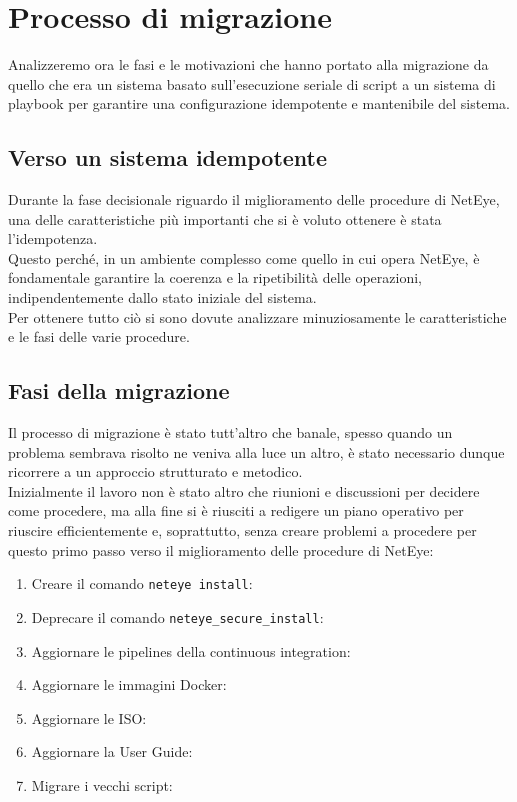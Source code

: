 \section{Processo di migrazione}
\label{sec:processo_migrazione}

Analizzeremo ora le fasi e le motivazioni che hanno portato alla migrazione da
quello che era un sistema basato sull'esecuzione seriale di script a un sistema
di playbook per garantire una configurazione idempotente e mantenibile del
sistema.

\subsection{Verso un sistema idempotente}
\label{sub:prerequisiti_migrazione}

Durante la fase decisionale riguardo il miglioramento delle procedure di NetEye,
una delle caratteristiche più importanti che si è voluto ottenere è stata l'idempotenza.\\
Questo perché, in un ambiente complesso come quello in cui opera NetEye, è
fondamentale garantire la coerenza e la ripetibilità delle operazioni, indipendentemente
dallo stato iniziale del sistema.\\ Per ottenere tutto ciò si sono dovute analizzare
minuziosamente le caratteristiche e le fasi delle varie procedure.

\subsection{Fasi della migrazione}
\label{sub:fasi_migrazione}

Il processo di migrazione è stato tutt'altro che banale, spesso quando un problema
sembrava risolto ne veniva alla luce un altro, è stato necessario dunque
ricorrere a un approccio strutturato e metodico.\\ Inizialmente il lavoro non è
stato altro che riunioni e discussioni per decidere come procedere, ma alla fine
si è riusciti a redigere un piano operativo per riuscire efficientemente e,
soprattutto, senza creare problemi a procedere per questo primo passo verso il miglioramento
delle procedure di NetEye:
\begin{enumerate}
  \item Creare il comando \texttt{neteye install}:

  \item Deprecare il comando \texttt{neteye\_secure\_install}:

  \item Aggiornare le pipelines della continuous integration:

  \item Aggiornare le immagini Docker:

  \item Aggiornare le ISO:

  \item Aggiornare la User Guide:

  \item Migrare i vecchi script:
\end{enumerate}

